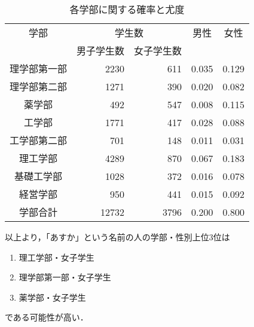 \documentclass[12pt]{jarticle}
\begin{document}
\begin{table}[h]
    \centering
    \caption{各学部に関する確率と尤度}
    \begin{tabular}{|c|r|r|r|r|} \hline
        学部         & \multicolumn{2}{|c|}{学生数} & \multicolumn{1}{|c|}{男性} & \multicolumn{1}{|c|}{女性}         \\ \cline{2-3}
                     & 男子学生数                   & 女子学生数                 &                            &       \\ \hline \hline
        理学部第一部 & 2230                         & 611                        & 0.035                      & 0.129 \\ \hline
        理学部第二部 & 1271                         & 390                        & 0.020                      & 0.082 \\ \hline
        薬学部       & 492                          & 547                        & 0.008                      & 0.115 \\ \hline
        工学部       & 1771                         & 417                        & 0.028                      & 0.088 \\ \hline
        工学部第二部 & 701                          & 148                        & 0.011                      & 0.031 \\ \hline
        理工学部     & 4289                         & 870                        & 0.067                      & 0.183 \\ \hline
        基礎工学部   & 1028                         & 372                        & 0.016                      & 0.078 \\ \hline
        経営学部     & 950                          & 441                        & 0.015                      & 0.092 \\ \hline
        学部合計     & 12732                        & 3796                       & 0.200                      & 0.800 \\ \hline
    \end{tabular}
\end{table}
以上より，「あすか」という名前の人の学部・性別上位3位は
\begin{enumerate}
    \item 理工学部・女子学生
    \item 理学部第一部・女子学生
    \item 薬学部・女子学生
\end{enumerate}
である可能性が高い．
\end{document}
